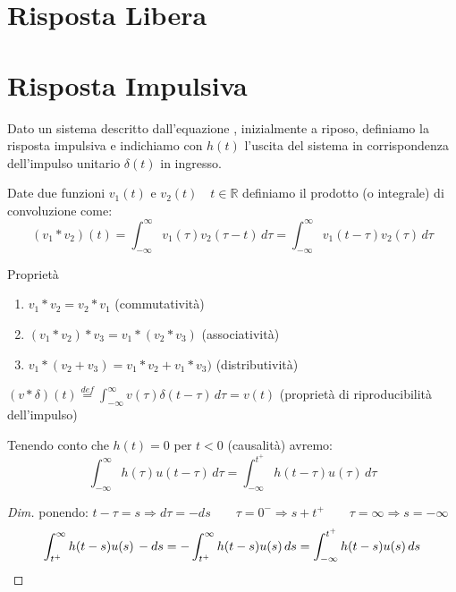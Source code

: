\section{Risposta Libera}



\section{Risposta Impulsiva}

\begin{definizione}
	Dato un sistema descritto dall'equazione %
	, inizialmente a riposo, definiamo la risposta impulsiva e indichiamo con $h(t)$ l'uscita del sistema in corrispondenza dell'impulso unitario $\delta (t)$ in ingresso.
\end{definizione}

\begin{definizione}
	Date due funzioni $v_1(t)$ e $v_2(t) \quad t\in\mathbb{R} $ definiamo il prodotto (o integrale) di convoluzione come:
	\begin{equation*}
		(v_1 * v_2)(t) 
		= \int_{-\infty}^{\infty}v_1(\tau)v_2(\tau - t)\,d\tau 
		= \int_{-\infty}^{\infty}v_1(t - \tau)v_2(\tau )\,d\tau
	\end{equation*}
	
	Proprietà
	\begin{enumerate}
		\item $v_1 * v_2 = v_2 * v_1 $ (commutatività)
		\item $(v_1 * v_2) * v_3  = v_1 * (v_2 * v_3) $ (associatività)
		\item $v_1 * (v_2 + v_3)  = v_1 * v_2 + v_1 * v_3)$ (distributività)
	\end{enumerate}

\begin{osservazione}
	$(v *\delta)(t)\overset{def}{=} \int_{-\infty}^{\infty}v(\tau)\delta(t - \tau)\,d\tau = v(t)$ (proprietà di riproducibilità dell'impulso)
\end{osservazione}
\end{definizione}
Tenendo conto che $h(t)=0$ per $t<0$ (causalità) avremo:
\begin{equation*}
	\int_{-\infty}^{\infty}h(\tau)u(t - \tau)\,d\tau 
	= \int_{-\infty}^{t^+}h(t - \tau)u(\tau)\,d\tau
\end{equation*}
\begin{proof}[Dim]
ponendo:  $t-\tau = s \Rightarrow d\tau = - ds 
\qquad \tau = 0^-  \Rightarrow s+t^+ 
\qquad \tau=\infty \Rightarrow s = -\infty$
\[
\int_{t^+}^{\infty}h(t-s)u(s)\,-ds 
=-\int_{t^+}^{\infty}h(t-s)u(s)\,ds
=\int_{-\infty}^{t^+}h(t-s)u(s)\,ds
\qedhere
\]
\end{proof}

